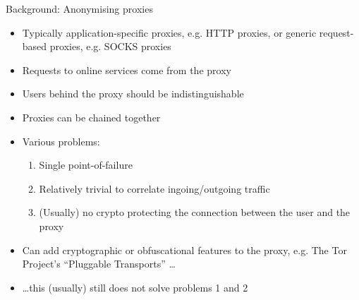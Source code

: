 \documentclass[9pt,a4paper,handout]{beamer}
\begin{document}
\begin{frame}{Background: Anonymising proxies}
  \begin{itemize}
    \item Typically application-specific proxies, e.g. HTTP proxies, or
      generic request-based proxies, e.g. SOCKS proxies
    \item Requests to online services come from the proxy 
    \item Users behind the proxy should be indistinguishable
    \item Proxies can be chained together
    \item Various problems:
      \begin{enumerate}
        \item Single point-of-failure
        \item<2-> Relatively trivial to correlate ingoing/outgoing traffic
        \item<3-> (Usually) no crypto protecting the connection between the user and the proxy
      \end{enumerate}
    \item<4-> Can add cryptographic or obfuscational features to the proxy, e.g. The
      Tor Project's ``Pluggable Transports'' \dots
    \item<5-> \dots this (usually) still does not solve problems 1 and 2
  \end{itemize}

\end{frame}
\end{document}
